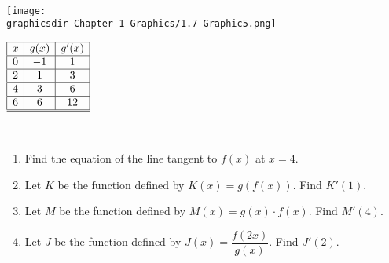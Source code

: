  \\
\begin{minipage}[t]{0.75\textwidth} \vspace{0pt}%
    \texttt{[image: \\graphicsdir Chapter 1 Graphics/1.7-Graphic5.png]}
\end{minipage} \hfill \begin{minipage}[t]{0.2\textwidth} \vspace{11pt}%
    \def\arraystretch{1.4}
    $\begin{array}{|c|c|c|}
        \hline
        x & g(x) & g'(x) \\ \hline
        0 & -1 & 1 \\ \hline
        2 & 1 & 3 \\ \hline
        4 & 3 & 6 \\ \hline
        6 & 6 & 12 \\ \hline
        \hline
    \end{array}$
\end{minipage} \\

\begin{enumerate}[label=\hspace{11pt}(\alph*), align=left, leftmargin=*, labelsep=0.25em]
    \item Find the equation of the line tangent to $f(x)$ at $x = 4$.
    \item Let $K$ be the function defined by $K(x) = g(f(x))$. Find $K'(1)$.
    \item Let $M$ be the function defined by $M(x) = g(x) \cdot f(x)$. Find $M'(4)$.
    \item Let $J$ be the function defined by $J(x) = \dfrac{f(2x)}{g(x)}$. Find $J'(2)$.
\end{enumerate} \vspace{11pt}


